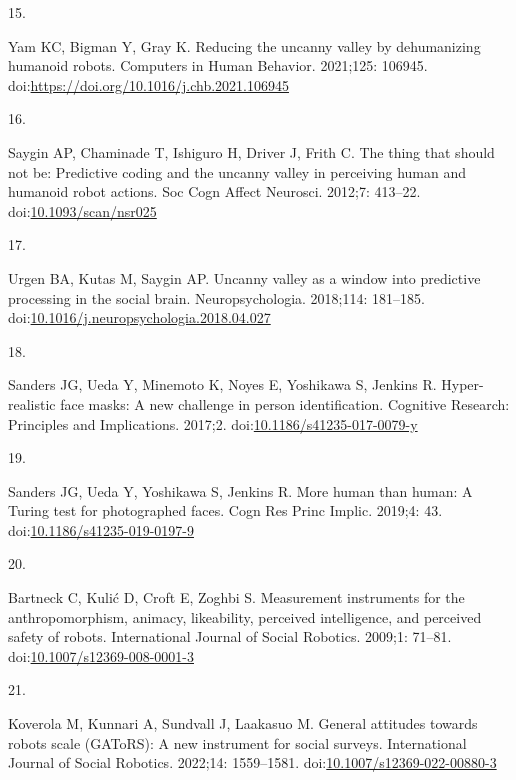 \documentclass[
]{article}
\newlength{\cslhangindent}
\newlength{\csllabelwidth}
\newenvironment{CSLReferences}[2] %
 {\begin{list}{}{%
  \setlength{\itemindent}{0pt}
  \setlength{\leftmargin}{0pt}
  \setlength{\parsep}{0pt}
  \ifodd #1
   \setlength{\leftmargin}{\cslhangindent}
   \setlength{\itemindent}{-1\cslhangindent}
  \fi
  \setlength{\itemsep}{#2\baselineskip}}}
 {\end{list}}
\newcommand{\CSLLeftMargin}[1]{\parbox[t]{\csllabelwidth}{\strut#1\strut}}
\newcommand{\CSLRightInline}[1]{\parbox[t]{\linewidth - \csllabelwidth}{\strut#1\strut}}
\begin{document}
\begin{CSLReferences}{0}{1}
\CSLLeftMargin{15. }%
\CSLRightInline{Yam KC, Bigman Y, Gray K. Reducing the uncanny valley by dehumanizing humanoid robots. Computers in Human Behavior. 2021;125: 106945. doi:\url{https://doi.org/10.1016/j.chb.2021.106945}}

\CSLLeftMargin{16. }%
\CSLRightInline{Saygin AP, Chaminade T, Ishiguro H, Driver J, Frith C. The thing that should not be: Predictive coding and the uncanny valley in perceiving human and humanoid robot actions. Soc Cogn Affect Neurosci. 2012;7: 413--22. doi:\href{https://doi.org/10.1093/scan/nsr025}{10.1093/scan/nsr025}}

\CSLLeftMargin{17. }%
\CSLRightInline{Urgen BA, Kutas M, Saygin AP. Uncanny valley as a window into predictive processing in the social brain. Neuropsychologia. 2018;114: 181--185. doi:\href{https://doi.org/10.1016/j.neuropsychologia.2018.04.027}{10.1016/j.neuropsychologia.2018.04.027}}

\CSLLeftMargin{18. }%
\CSLRightInline{Sanders JG, Ueda Y, Minemoto K, Noyes E, Yoshikawa S, Jenkins R. Hyper-realistic face masks: A new challenge in person identification. Cognitive Research: Principles and Implications. 2017;2. doi:\href{https://doi.org/10.1186/s41235-017-0079-y}{10.1186/s41235-017-0079-y}}

\CSLLeftMargin{19. }%
\CSLRightInline{Sanders JG, Ueda Y, Yoshikawa S, Jenkins R. More human than human: A {Turing} test for photographed faces. Cogn Res Princ Implic. 2019;4: 43. doi:\href{https://doi.org/10.1186/s41235-019-0197-9}{10.1186/s41235-019-0197-9}}

\CSLLeftMargin{20. }%
\CSLRightInline{Bartneck C, Kulić D, Croft E, Zoghbi S. Measurement instruments for the anthropomorphism, animacy, likeability, perceived intelligence, and perceived safety of robots. International Journal of Social Robotics. 2009;1: 71--81. doi:\href{https://doi.org/10.1007/s12369-008-0001-3}{10.1007/s12369-008-0001-3}}

\CSLLeftMargin{21. }%
\CSLRightInline{Koverola M, Kunnari A, Sundvall J, Laakasuo M. General attitudes towards robots scale (GAToRS): A new instrument for social surveys. International Journal of Social Robotics. 2022;14: 1559--1581. doi:\href{https://doi.org/10.1007/s12369-022-00880-3}{10.1007/s12369-022-00880-3}}


\end{CSLReferences}
\end{document}
